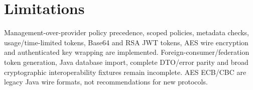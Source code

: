 \documentclass[a4paper]{arrowhead}
\begin{document}
\section{Limitations}
Management-over-provider policy precedence, scoped policies, metadata checks, usage/time-limited tokens, Base64 and RSA JWT tokens, AES wire encryption and authenticated key wrapping are implemented. Foreign-consumer/federation token generation, Java database import, complete DTO/error parity and broad cryptographic interoperability fixtures remain incomplete. AES ECB/CBC are legacy Java wire formats, not recommendations for new protocols.
\end{document}
